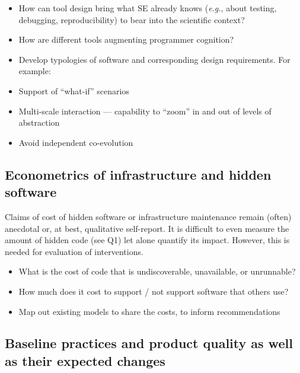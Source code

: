\documentclass[a4paper,UKenglish]{dagman}
\newcommand{\eg}{\emph{e.g.},\xspace}
\begin{document}
\begin{itemize}
\item How can tool design bring what SE already knows (\eg about testing, debugging, reproducibility) to bear into the scientific context?
\item How are different tools augmenting programmer cognition?
\item Develop typologies of software and corresponding design requirements. For example:
\item Support of ``what-if'' scenarios
\item Multi-scale interaction --- capability to ``zoom'' in and out of levels of abstraction
\item Avoid independent co-evolution
\end{itemize}

\subsection{Econometrics of infrastructure and hidden software}

Claims of cost of hidden software or infrastructure maintenance remain (often) anecdotal or, at best, qualitative self-report. It is difficult to even measure the amount of hidden code (see Q1) let alone quantify its impact. However, this is needed for evaluation of interventions.


\begin{itemize}
\item What is the cost of code that is undiscoverable, unavailable, or unrunnable?
\item How much does it cost to support / not support software that others use? 
\item Map out existing models to share the costs, to inform recommendations
\end{itemize}


\subsection{Baseline practices and product quality as well as their expected changes}
\end{document}
